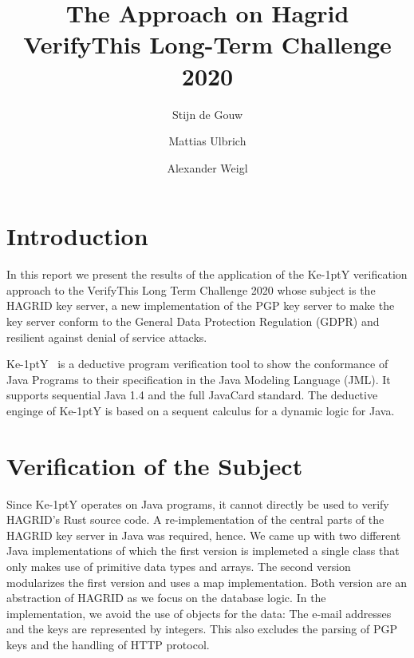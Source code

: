 \documentclass{llncs}
\title{The \KeY Approach on Hagrid
  \\{\small VerifyThis Long-Term Challenge 2020 }}
\author{ Stijn de Gouw \and Mattias Ulbrich \and Alexander Weigl }
\institute{Open University \and Karlsruhe Institute of Technology}
\newcommand{\KeY}{Ke\kern-1ptY\xspace}
\begin{document}
\maketitle

\section{Introduction}

In this report we present the results of the application of the \KeY
verification approach to the VerifyThis Long Term Challenge 2020 whose
subject is the HAGRID key server, a new implementation of the PGP key
server to make the key server conform to the General Data Protection
Regulation (GDPR) and resilient against denial of service attacks.




\KeY~\cite{KeyBook2} is a deductive program verification tool to show
the conformance of Java Programs to their specification in the Java
Modeling Language (JML). It supports sequential Java 1.4 and the full
JavaCard  standard.
%
The deductive enginge of \KeY is based on a sequent calculus for a
dynamic logic for
Java. %


\section{Verification of the Subject}
%
Since \KeY operates on Java programs, it cannot directly be used to
verify HAGRID's Rust source code. A re-implementation of the central
parts of the HAGRID key server in Java was required, hence.
%
We came up with two different Java implementations of which the first
version is implemeted a single class that only makes use of primitive
data types and arrays. The second version modularizes the first
version and uses a map implementation. Both version are an abstraction
of HAGRID as we focus on the database logic. In the implementation, we
avoid the use of objects for the data: The e-mail addresses and the
keys are represented by integers. This also excludes the parsing of
PGP keys and the handling of HTTP protocol.  
\end{document}
